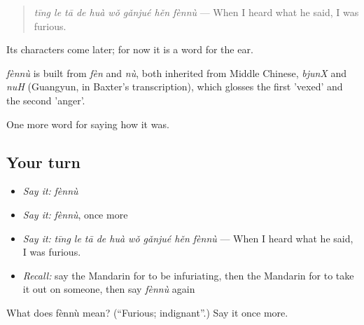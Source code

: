 \begin{quote}
\emph{tīng le tā de huà wǒ gǎnjué hěn fènnù} — When I heard what he said, I was furious.
\end{quote}

Its characters come later; for now it is a word for the ear.

\begin{cousinweb}
\emph{fènnù} is built from \emph{fèn} and \emph{nù}, both inherited from Middle Chinese, \emph{bjunX} and \emph{nuH} (Guangyun, in Baxter's transcription), which glosses the first 'vexed' and the second 'anger'.
\end{cousinweb}

\begin{grammarlens}[title={What you've built}]
One more word for saying how it was.
\end{grammarlens}

\subsection*{Your turn}
\begin{itemize}
\raggedright
  \item \emph{Say it:} \emph{fènnù}
  \item \emph{Say it:} \emph{fènnù}, once more
  \item \emph{Say it:} \emph{tīng le tā de huà wǒ gǎnjué hěn fènnù} — When I heard what he said, I was furious.
  \item \emph{Recall:} say the Mandarin for to be infuriating, then the Mandarin for to take it out on someone, then say \emph{fènnù} again
\end{itemize}

\begin{tcolorbox}[breakable,colback=teal!4,colframe=teal!35!black,title={Before you move on}]
What does fènnù mean? (\textquotedblleft{}Furious; indignant\textquotedblright{}.) Say it once more.
\end{tcolorbox}
